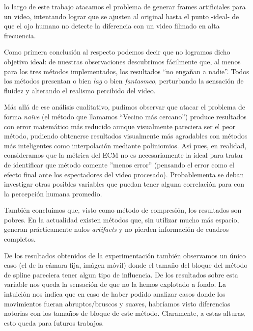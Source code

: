 lo largo de este trabajo atacamos el problema de generar
frames artificiales para un video, intentando lograr que se ajusten al original
hasta el punto -ideal- de que el ojo humano no detecte la diferencia con un
video filmado en alta frecuencia.

\par Como primera conclusión al respecto podemos decir que no logramos dicho
objetivo ideal: de nuestras observaciones descubrimos fácilmente que, al menos
para los tres métodos implementados, los resultados ``no engañan a nadie''.
Todos los métodos presentan o bien \emph{lag} o bien \emph{fantasmeo},
perturbando la sensación de fluidez y alterando el realismo percibido del
video.

\par Más allá de ese análisis cualitativo, pudimos observar que atacar el
problema de forma \emph{naïve} (el método que llamamos ``Vecino más cercano'')
produce resultados con error matemático más reducido aunque visualmente
pareciera ser el peor método, pudiendo obtenerse resultados visualmente más
agradables con métodos más inteligentes como interpolación mediante
poliniomios. As\'i pues, en realidad, consideramos que la m\'etrica del ECM
no es necesariamente la ideal para tratar de identificar que m\'etodo comente
''menos error'' (pensando el error como el efecto final ante los espectadores
del video procesado). Probablementa se deban investigar otras posibles variables
que puedan tener alguna correlaci\'on para con la percepci\'on humana promedio.

\par También concluimos que, visto como método de compresión, los resultados
son pobres. En la actualidad existen métodos que, sin utilizar mucho más
espacio, generan prácticamente nulos \emph{artifacts} y no pierden información
de cuadros completos.

\par De los resultados obtenidos de la experimentaci\'on tambi\'en observamos
un \'unico caso (el de la c\'amara fija, im\'agen m\'ovil) donde el tama\~no
del bloque del m\'etodo de spline pareciera tener algun tipo de influencia.
De los resultados sobre esta variable nos queda la sensaci\'on de que no
la hemos explotado a fondo. La intuici\'on nos indica que en caso de haber
podido analizar casos donde los movimientos fueran abruptos/bruscos y suaves,
habr\'iamos visto diferencias notorias con los tama\~nos de bloque de este
m\'etodo. Claramente, a estas alturas, esto queda para futuros trabajos.

